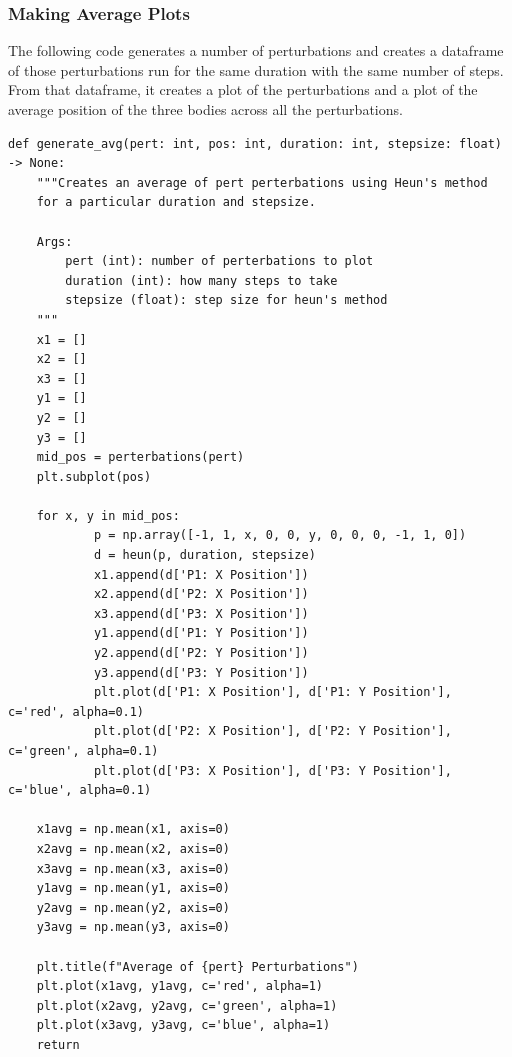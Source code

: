 \documentclass{article}
\begin{document}
\subsubsection{Making Average Plots}
The following code generates a number of perturbations and creates a dataframe of those perturbations run for the same duration with the same number of steps. From that dataframe, it creates a plot of the perturbations and a plot of the average position of the three bodies across all the perturbations. 
\begin{verbatim}
def generate_avg(pert: int, pos: int, duration: int, stepsize: float) -> None:
    """Creates an average of pert perterbations using Heun's method 
    for a particular duration and stepsize.

    Args:
        pert (int): number of perterbations to plot
        duration (int): how many steps to take
        stepsize (float): step size for heun's method
    """
    x1 = []
    x2 = []
    x3 = []
    y1 = []
    y2 = []
    y3 = []
    mid_pos = perterbations(pert)
    plt.subplot(pos)

    for x, y in mid_pos:
            p = np.array([-1, 1, x, 0, 0, y, 0, 0, 0, -1, 1, 0])
            d = heun(p, duration, stepsize)
            x1.append(d['P1: X Position'])
            x2.append(d['P2: X Position'])
            x3.append(d['P3: X Position'])
            y1.append(d['P1: Y Position'])
            y2.append(d['P2: Y Position'])
            y3.append(d['P3: Y Position'])
            plt.plot(d['P1: X Position'], d['P1: Y Position'], c='red', alpha=0.1)
            plt.plot(d['P2: X Position'], d['P2: Y Position'], c='green', alpha=0.1)
            plt.plot(d['P3: X Position'], d['P3: Y Position'], c='blue', alpha=0.1)

    x1avg = np.mean(x1, axis=0)
    x2avg = np.mean(x2, axis=0)
    x3avg = np.mean(x3, axis=0)
    y1avg = np.mean(y1, axis=0)
    y2avg = np.mean(y2, axis=0)
    y3avg = np.mean(y3, axis=0)

    plt.title(f"Average of {pert} Perturbations")
    plt.plot(x1avg, y1avg, c='red', alpha=1)
    plt.plot(x2avg, y2avg, c='green', alpha=1)
    plt.plot(x3avg, y3avg, c='blue', alpha=1)
    return
\end{verbatim}
\end{document}
